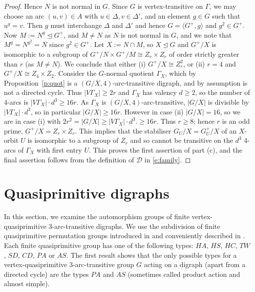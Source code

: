 \documentclass[11pt]{amsart}
\newcommand\DD{{\mathscr{D}}}
\begin{document}
\begin{proof}
   Hence $N$ is not normal in $G$. Since $G$ is vertex-transitive on $\Gamma$, we may choose an arc $(u,v)\in A$ with $u\in\Delta, v\in\Delta'$, and an element $g\in G$ such that $u^g=v$. Then $g$ must interchange $\Delta$ and $\Delta'$ and hence $G=\langle G^+, g\rangle$ and $g^2\in G^+$. Now $M:=N^g\unlhd G^+$, and $M\ne N$ as $N$ is not normal in $G$, and we note that $M^g=N^{g^2}=N$ since $g^2\in G^+$. Let $X:=N\cap M$, so $X\unlhd G$ and $G^+/X$ is isomorphic to a subgroup of $G^+/N\times G^+/M\cong Z_r\times Z_r$ of order strictly greater than $r$ (as $M\ne N$). We conclude that either (i) $G^+/X\cong Z_r^2$, or (ii) $r=4$ and $G^+/X\cong Z_4\times Z_2$.   Consider the $G$-normal quotient $\Gamma_X$, which by Proposition~\ref{p:quot} is a $(G/X,4)$-arc-transitive digraph, and by assumption is not a directed cycle. Thus $|V\Gamma_X|\geq 2r$ and $\Gamma_X$ has valency $d\geqslant2$, so the number of $4$-arcs is $|V\Gamma_X|\cdot d^3\geq 16r$. As $\Gamma_X$ is $(G/X,4)$-arc-transitive, $|G/X|$ is divisible by $|V\Gamma_X|\cdot d^3$, so in particular $|G/X|\geq 16r$. However in case (ii) $|G/X|=16$, so we are in case (i) with $2r^2=|G/X|\geq |V\Gamma_X|\cdot d^3.\geqslant 16 r$. Thus $r\geqslant 8$; hence $r$ is an odd prime, $G^+/X=Z_r\times Z_r$. This implies that the stabiliser $G_U/X=G^+_U/X$ of an $X$-orbit $U$ is isomorphic to a subgroup of $Z_r$ and so cannot be transitive on the $d^3$ $4$-arcs of $\Gamma_X$ with first entry $U$.  This proves the first assertion of part (c), and the final assertion follows from the definition of $\DD$ in \eqref{e:family}.
   \end{proof}


\section{Quasiprimitive digraphs}\label{section:quasi}

In this section, we examine the automorphism groups of finite vertex-quasiprimitive  $3$-arc-transitive  digraphs. We use the subdivision of finite quasiprimitive permutation groups introduced in \cite[Section 5]{BCC97} and conveniently described in \cite[Table 7.1]{csaba}. Each finite quasiprimitive group has one of the following types:  \(HA\), \(HS\), \(HC\), \(TW\), \(SD\), \(CD\), \(PA\) or \(AS\). The first result shows that the only possible types for a vertex-quasiprimitive $3$-arc-transitive group $G$ acting on a digraph (apart from a directed cycle) are the types \(PA\) and \(AS\) (sometimes called product action and almost simple).  
\end{document}
